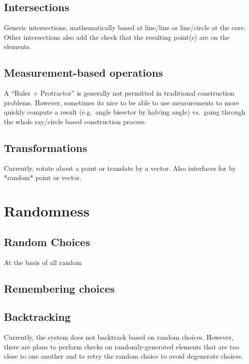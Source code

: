\subsection{Intersections}

Generic intersections, mathematically based at line/line or
line/circle at the core. Other intersections also add the check that
the resulting point(s) are on the elements.

\subsection{Measurement-based operations}

A ``Ruler + Protractor'' is generally not permitted in traditional
construction problems. However, sometimes its nice to be able to use
measurements to more quickly compute a result (e.g.\ angle bisector by
halving angle) vs.\ going through the whole ray/circle based
construction process.

\subsection{Transformations}

Currently, rotate about a point or translate by a vector. Also
interfaces for by *random* point or vector.

\section{Randomness}

\subsection{Random Choices}

At the basis of all random

\subsection{Remembering choices}

\subsection{Backtracking}

Currently, the system does not backtrack based on random
choices. However, there are plans to perform checks on
randomly-generated elements that are too close to one another and to
retry the random choice to avoid degenerate choices.

